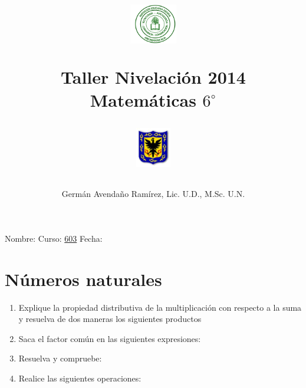 \documentclass[10pt,twoside]{article}
\author{Germ\'an Avenda\~no Ram\'irez, Lic. U.D., M.Sc. U.N.}
\title{\begin{minipage}{.2\textwidth}
\includegraphics[height=1.75cm]{Images/logo-colegio.png}\end{minipage}
\begin{minipage}{.55\textwidth}
\begin{center}
Taller Nivelación 2014 \\
Matemáticas $6^{\circ}$
\end{center}
\end{minipage}\hfill
\begin{minipage}{.2\textwidth}
\includegraphics[height=1.75cm]{Images/logo-sed.png} 
\end{minipage}}
\date{}
\begin{document}
\maketitle
Nombre: \hrulefill Curso: \underline{603} Fecha: \underline{\hspace*{2.5cm}}
\section*{N\'{u}meros naturales}
\begin{enumerate}
\item Explique la propiedad distributiva de la multiplicaci\'{o}n con respecto a la suma y resuelva de dos maneras los siguientes productos
\begin{enumerate}
\end{enumerate}
\item Saca el factor común en las siguientes expresiones:
\begin{enumerate}
\end{enumerate}
\item Resuelva y compruebe:
\begin{enumerate}
\end{enumerate}
\item Realice las siguientes operaciones:
\begin{enumerate}
\end{enumerate}
\end{enumerate}
\end{document}
